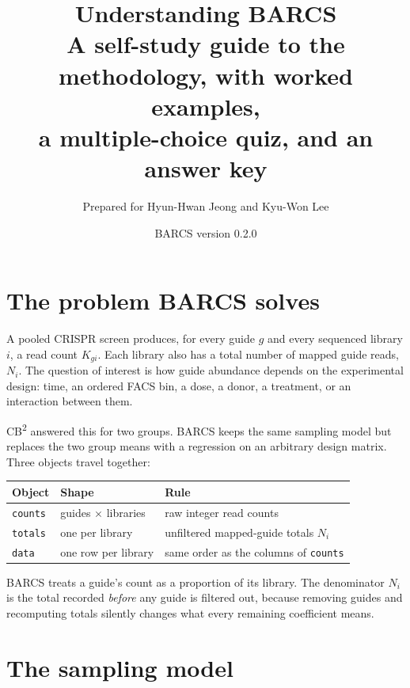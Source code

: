 \documentclass[11pt]{article}
\title{\textbf{Understanding BARCS}\\[4pt]
\large A self-study guide to the methodology, with worked examples,\\
a multiple-choice quiz, and an answer key}
\author{Prepared for Hyun-Hwan Jeong and Kyu-Won Lee}
\date{BARCS version 0.2.0}
\begin{document}
\sloppy
\maketitle
\tableofcontents
\newpage

\section{The problem BARCS solves}

A pooled CRISPR screen produces, for every guide $g$ and every sequenced
library $i$, a read count $K_{gi}$.  Each library also has a total number of
mapped guide reads, $N_i$.  The question of interest is how guide abundance
depends on the experimental design: time, an ordered FACS bin, a dose, a
donor, a treatment, or an interaction between them.

CB\textsuperscript{2} answered this for two groups.  BARCS keeps the same
sampling model but replaces the two group means with a regression on an
arbitrary design matrix.  Three objects travel together:

\begin{center}
\begin{tabular}{lll}
\toprule
Object & Shape & Rule\\
\midrule
\texttt{counts} & guides $\times$ libraries & raw integer read counts\\
\texttt{totals} & one per library & unfiltered mapped-guide totals $N_i$\\
\texttt{data} & one row per library & same order as the columns of \texttt{counts}\\
\bottomrule
\end{tabular}
\end{center}

\begin{keyidea}
BARCS treats a guide's count as a proportion of its library.  The denominator
$N_i$ is the total recorded \emph{before} any guide is filtered out, because
removing guides and recomputing totals silently changes what every remaining
coefficient means.
\end{keyidea}

\section{The sampling model}
\end{document}
